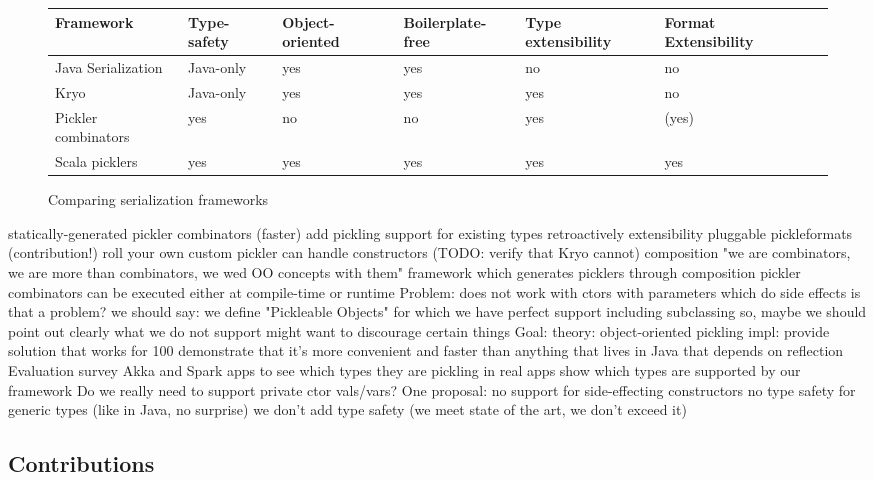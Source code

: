 \documentclass[preprint,10pt]{sigplanconf}
\begin{document}
\begin{figure}[t]
\begin{tabular}{|l|l|l|l|l|l|l|}
\hline
Framework           & Type-safety  & Object-oriented  & Boilerplate-free  & Type extensibility  & Format Extensibility \\
\hline
Java Serialization  & Java-only    & yes              & yes          & no                  & no \\
Kryo                & Java-only    & yes              & yes          & yes                 & no \\
Pickler combinators & yes          & no               & no           & yes                 & (yes) \\
Scala picklers      & yes          & yes              & yes          & yes                 & yes \\
\hline
\end{tabular}

\caption{Comparing serialization frameworks}\label{fig:comparison}
\end{figure}

statically-generated pickler combinators (faster)
add pickling support for existing types retroactively
extensibility
pluggable pickleformats (contribution!)
roll your own custom pickler
can handle constructors (TODO: verify that Kryo cannot)
composition
"we are combinators, we are more than combinators, we wed OO concepts with them"
framework which generates picklers through composition
pickler combinators can be executed either at compile-time or runtime
Problem: does not work with ctors with parameters which do side effects
is that a problem?
we should say: we define "Pickleable Objects" for which we have perfect support including subclassing
so, maybe we should point out clearly what we do not support
might want to discourage certain things
Goal:
theory: object-oriented pickling
impl: provide solution that works for 100%
demonstrate that it's more convenient and faster than anything that lives in Java that depends on reflection
Evaluation
survey Akka and Spark apps to see which types they are pickling in real apps
show which types are supported by our framework
Do we really need to support private ctor vals/vars?
One proposal:
no support for side-effecting constructors
no type safety for generic types (like in Java, no surprise)
we don't add type safety (we meet state of the art, we don't exceed it)


\subsection{Contributions}
\end{document}
